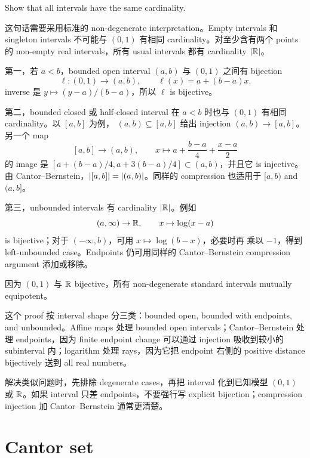 \begin{exerciseblock}
Show that all intervals have the same cardinality.
\end{exerciseblock}

\begin{solution}
这句话需要采用标准的 non-degenerate interpretation。Empty intervals 和
singleton intervals 不可能与 \((0,1)\) 有相同 cardinality。对至少含有两个
points 的 non-empty real intervals，所有 usual intervals 都有 cardinality
\(\left|\mathbb{R}\right|\)。

第一，若 \(a<b\)，bounded open interval \((a,b)\) 与 \((0,1)\) 之间有
bijection
\[
  \ell:(0,1)\to(a,b),\qquad \ell(x)=a+(b-a)x.
\]
inverse 是 \(y\mapsto (y-a)/(b-a)\)，所以 \(\ell\) is bijective。

第二，bounded closed 或 half-closed interval 在 \(a<b\) 时也与
\((0,1)\) 有相同 cardinality。以 \([a,b]\) 为例，
\((a,b)\subseteq[a,b]\) 给出 injection \((a,b)\to[a,b]\)。另一个 map
\[
  [a,b]\to(a,b),\qquad x\mapsto a+\frac{b-a}{4}+\frac{x-a}{2}
\]
的 image 是 \([a+(b-a)/4,a+3(b-a)/4]\subset(a,b)\)，并且它 is injective。
由 Cantor--Bernstein，\(\left|[a,b]\right|=\left|(a,b)\right|\)。同样的 compression
也适用于 \([a,b)\) and \((a,b]\)。

第三，unbounded intervals 有 cardinality \(\left|\mathbb{R}\right|\)。例如
\[
  (a,\infty)\to\mathbb{R},\qquad x\mapsto \log(x-a)
\]
is bijective；对于 \((-\infty,b)\)，可用 \(x\mapsto \log(b-x)\)，必要时再
乘以 \(-1\)，得到 left-unbounded case。Endpoints 仍可用同样的
Cantor--Bernstein compression argument 添加或移除。

因为 \((0,1)\) 与 \(\mathbb{R}\) bijective，所有 non-degenerate standard intervals
mutually equipotent。
\end{solution}

\begin{explanation}
这个 proof 按 interval shape 分三类：bounded open, bounded with endpoints,
and unbounded。Affine maps 处理 bounded open intervals；Cantor--Bernstein
处理 endpoints，因为 finite endpoint change 可以通过 injection 吸收到较小的
subinterval 内；logarithm 处理 rays，因为它把 endpoint 右侧的 positive
distance bijectively 送到 all real numbers。

解决类似问题时，先排除 degenerate cases，再把 interval 化到已知模型
\((0,1)\) 或 \(\mathbb{R}\)。如果 interval 只差 endpoints，不要强行写 explicit
bijection；compression injection 加 Cantor--Bernstein 通常更清楚。
\end{explanation}

\section{Cantor set \optional}

